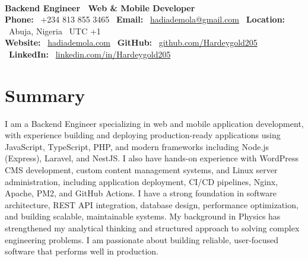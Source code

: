 \documentclass{article}
\newcommand{\resumename}[1]{{\textls[50]{\fontsize{24pt}{24pt}\selectfont\textbf{#1}}}}
\newcommand{\jobtitle}[1]{{\fontsize{14pt}{13.5pt}\selectfont\textbf{#1}}}
\newcommand{\contactinfo}[1]{{\fontsize{11pt}{13pt}\selectfont\color{black!70}#1}}
\begin{document}
\begin{center}
    \resumename{Hadi Ademola Surajudeen} \\[0.1cm]
    \jobtitle{Backend Engineer \textbar\ Web \& Mobile Developer} \\[0.1cm]
    \contactinfo{
        \textbf{Phone:} \ +234 813 855 3465 \textbar\ 
        \textbf{Email:} \ \href{mailto:hadiademola@gmail.com}{hadiademola@gmail.com} \textbar\ 
        \textbf{Location:} \ Abuja, Nigeria \textbar\ UTC +1
    } \\[0.1cm]
    \contactinfo{
        \textbf{Website:} \ \href{https://hadiademola.vercel.app}{hadiademola.com} \textbar\
        \textbf{GitHub:} \ \href{https://github.com/Hardeygold205}{github.com/Hardeygold205} \textbar\ 
        \textbf{LinkedIn:} \ \href{https://linkedin.com/in/Hardeygold205}{linkedin.com/in/Hardeygold205}
    }
\end{center}

\vspace{-0.1cm}

\section{Summary}
I am a Backend Engineer specializing in web and mobile application development, with experience building and deploying production-ready applications using JavaScript, TypeScript, PHP, and modern frameworks including Node.js (Express), Laravel, and NestJS. I also have hands-on experience with WordPress CMS development, custom content management systems, and Linux server administration, including application deployment, CI/CD pipelines, Nginx, Apache, PM2, and GitHub Actions. I have a strong foundation in software architecture, REST API integration, database design, performance optimization, and building scalable, maintainable systems. My background in Physics has strengthened my analytical thinking and structured approach to solving complex engineering problems. I am passionate about building reliable, user-focused software that performs well in production.

\vspace{0.1cm}
\end{document}
